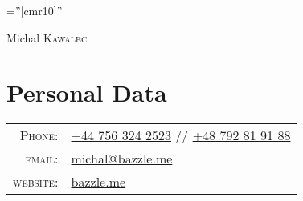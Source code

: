 \documentclass[a4paper,10pt]{article}
\begin{document}
\pagestyle{empty} %

\font\fb=''[cmr10]'' %

\par{\centering
		{\Huge Michal \textsc{Kawalec}
	}\bigskip\par}

\section{Personal Data}

\begin{tabular}{rl}
    \textsc{Phone:}     & \href{tel:+447563242523}{+44 756 324 2523} // \href{tel:+48792819188}{+48 792 81 91 88}\\
    \textsc{email:}     & \href{mailto:michal@bazzle.me}{michal@bazzle.me} \\
    \textsc{website:}   & \href{https://bazzle.me}{bazzle.me}
\end{tabular}

\end{document}
